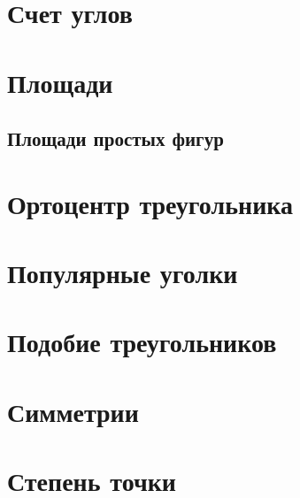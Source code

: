 \documentclass[twoside]{article}
\begin{document}
\pagestyle{empty}

% 


\newpage

\tableofcontents
\newpage

\setcounter{page}{1}
\pagestyle{fancy}


\section{Счет углов}


% 

\section{Площади}
\subsection{Площади простых фигур}

\section{Ортоцентр треугольника}


\section{Популярные уголки}


\section{Подобие треугольников}


\section{Симметрии}

\section{Степень точки}

\end{document}
